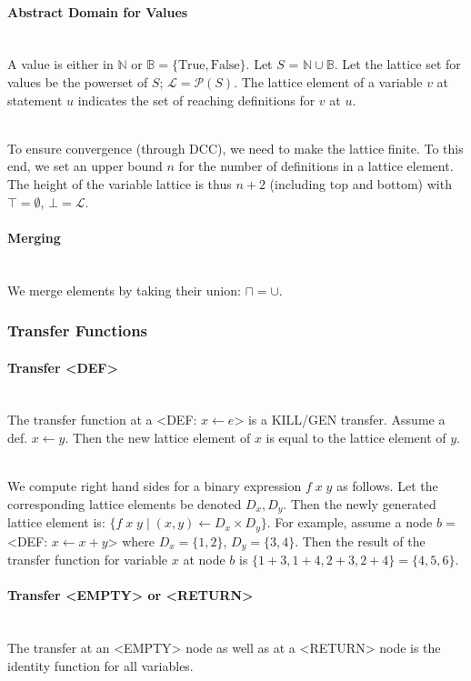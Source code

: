 \documentclass[a4paper]{article}
\newcommand{\NL}[0]{ \hfill\\\noindent }
\begin{document}
\paragraph{Abstract Domain for Values}\NL
A value is either in $\mathbb{N}$ or $\mathbb{B} = \{\text{True}, \text{False}\}$. Let $S$ = $\mathbb{N} \cup \mathbb{B}$. Let the lattice set for values be the powerset of $S$; $\mathcal{L} = \mathcal{P}(S)$. The lattice element of a variable $v$ at statement $u$ indicates the set of reaching definitions for $v$ at $u$. 

\NL
To ensure convergence (through DCC), we need to make the lattice finite. To this end, we set an upper bound $n$ for the number of definitions in a lattice element. The height of the variable lattice is thus $n + 2$ (including top and bottom) with $\top = \emptyset$, $\bot = \mathcal{L}$.



\paragraph{Merging}\NL
We merge elements by taking their union: $\sqcap = \cup$. 

\subsubsection{Transfer Functions}
\paragraph{Transfer <DEF>}\NL
The transfer function at a <DEF: $x \leftarrow e$> is a KILL/GEN transfer. Assume a def. $x \leftarrow y$. Then the new lattice element of $x$ is equal to the lattice element of $y$.

\NL
We compute right hand sides for a binary expression $f\;x\;y$ as follows. Let the corresponding lattice elements be denoted $D_x, D_y$. Then the newly generated lattice element is:
$\{ f\;x\;y \;|\; (x,y) \leftarrow D_x \times D_y \}$. For example, assume a node $b = $ <DEF: $x \leftarrow x + y$> where $D_x = \{1,2\}$, $D_y = \{3,4\}$. Then the result of the transfer function for variable $x$ at node $b$ is $\{1 + 3, 1 + 4, 2 + 3, 2 + 4\} = \{4,5,6\}$.

\paragraph{Transfer <EMPTY> or <RETURN>}\NL
The transfer at an <EMPTY> node as well as at a <RETURN> node is the identity function for all variables.
\end{document}

